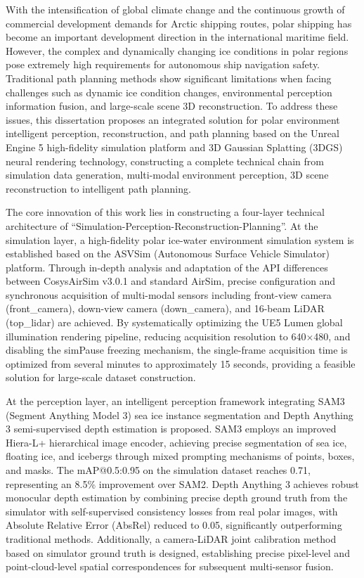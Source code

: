 \documentclass[12pt,a4paper]{ctexbook}
\begin{document}
With the intensification of global climate change and the continuous growth of commercial development demands for Arctic shipping routes, polar shipping has become an important development direction in the international maritime field. However, the complex and dynamically changing ice conditions in polar regions pose extremely high requirements for autonomous ship navigation safety. Traditional path planning methods show significant limitations when facing challenges such as dynamic ice condition changes, environmental perception information fusion, and large-scale scene 3D reconstruction. To address these issues, this dissertation proposes an integrated solution for polar environment intelligent perception, reconstruction, and path planning based on the Unreal Engine 5 high-fidelity simulation platform and 3D Gaussian Splatting (3DGS) neural rendering technology, constructing a complete technical chain from simulation data generation, multi-modal environment perception, 3D scene reconstruction to intelligent path planning.

The core innovation of this work lies in constructing a four-layer technical architecture of ``Simulation-Perception-Reconstruction-Planning''. At the simulation layer, a high-fidelity polar ice-water environment simulation system is established based on the ASVSim (Autonomous Surface Vehicle Simulator) platform. Through in-depth analysis and adaptation of the API differences between CosysAirSim v3.0.1 and standard AirSim, precise configuration and synchronous acquisition of multi-modal sensors including front-view camera (front\_camera), down-view camera (down\_camera), and 16-beam LiDAR (top\_lidar) are achieved. By systematically optimizing the UE5 Lumen global illumination rendering pipeline, reducing acquisition resolution to 640$\times$480, and disabling the simPause freezing mechanism, the single-frame acquisition time is optimized from several minutes to approximately 15 seconds, providing a feasible solution for large-scale dataset construction.

At the perception layer, an intelligent perception framework integrating SAM3 (Segment Anything Model 3) sea ice instance segmentation and Depth Anything 3 semi-supervised depth estimation is proposed. SAM3 employs an improved Hiera-L+ hierarchical image encoder, achieving precise segmentation of sea ice, floating ice, and icebergs through mixed prompting mechanisms of points, boxes, and masks. The mAP@0.5:0.95 on the simulation dataset reaches 0.71, representing an 8.5\% improvement over SAM2. Depth Anything 3 achieves robust monocular depth estimation by combining precise depth ground truth from the simulator with self-supervised consistency losses from real polar images, with Absolute Relative Error (AbsRel) reduced to 0.05, significantly outperforming traditional methods. Additionally, a camera-LiDAR joint calibration method based on simulator ground truth is designed, establishing precise pixel-level and point-cloud-level spatial correspondences for subsequent multi-sensor fusion.
\end{document}
